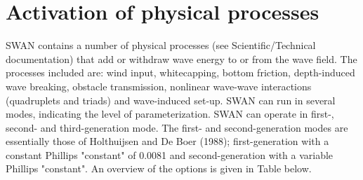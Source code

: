\documentclass[12pt]{book}
\begin{document}
\section{Activation of physical processes}
SWAN contains a number of physical processes (see Scientific/Technical documentation) that add or withdraw wave energy to or
from the wave field. The processes included are: wind input, whitecapping, bottom friction, depth-induced
wave breaking, obstacle transmission, nonlinear wave-wave interactions (quadruplets and triads) and
wave-induced set-up. SWAN can run in several modes, indicating the level of parameterization. SWAN can operate
in first-, second- and third-generation mode. The first- and second-generation modes are essentially those
of Holthuijsen and De Boer (1988); first-generation with a constant Phillips "constant" of 0.0081 and
second-generation with a variable Phillips "constant". An overview of the options is given in Table below.
\end{document}

